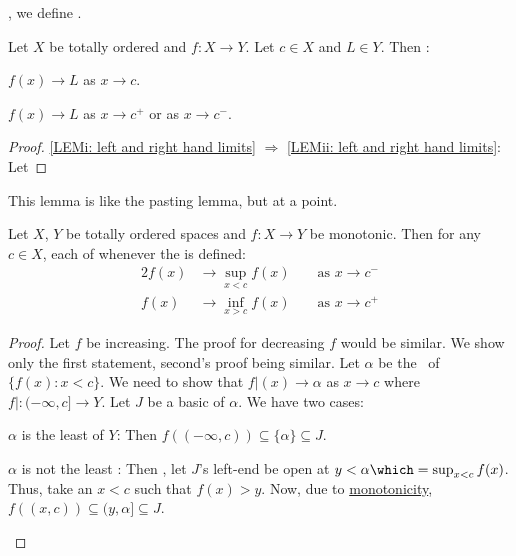 	\Lly, we define .
	
	
	\begin{lem}\label{LEM: limits via the left and right hand limits}
		Let $X$ be totally ordered and $f\colon X\to Y$. Let $c\in X$ and $L\in Y$. Then \tfae:
		\begin{mylist}
			\item\label{LEMi: left and right hand limits} $f(x)\to L$ as $x\to c$.
			
			\item\label{LEMii: left and right hand limits} $f(x)\to L$ as $x\to c^+$ or as $x\to c^-$.
		\end{mylist}
	\end{lem}
	
	\begin{proof}
		\ref{LEMi: left and right hand limits} $\Rightarrow$ \ref{LEMii: left and right hand limits}:
		Let 
	\end{proof}
	
	\begin{rmk}
		This lemma is like the pasting lemma, but at a point.
	\end{rmk}
	
	
	\begin{prp}\label{PRP: one-sided lims of monotonics}
		Let $X$, $Y$ be totally ordered spaces and $f\colon X\to Y$ be monotonic. Then for any $c\in X$, each of  whenever the \RHS is defined:
		\begin{alignat*}{2}
			f(x)& \to \sup_{x < c}f(x) &&\text{ as } x\to c^-\\
			f(x)& \to \inf_{x > c}f(x) &&\text{ as } x\to c^+
		\end{alignat*}
	\end{prp}
	
	\begin{proof}
		Let $f$ be increasing. The proof for decreasing $f$ would be similar. We show only the first statement, second's proof being similar. Let $\alpha$ be the \lub\ of $\{f(x) : x < c\}$. We need to show that $f|(x)\to \alpha$ as $x\to c$ where $f|\colon (-\infty, c]\to Y$. Let $J$ be a basic \onbd of $\alpha$. We have two cases:
		\begin{mylist}
			\item $\alpha$ is the least \elt of $Y$: Then $f((-\infty, c)) \subseteq \{\alpha\}\subseteq J$.
			
			\item $\alpha$ is not the least \elt: Then \wlogg, let $J$'s left-end be open at $y < \alpha\which = \sup_{x <c} f(x)$. Thus, take an $x < c$ such that $f(x) > y$. Now, due to \uline{monotonicity}, $f((x, c))\subseteq (y, \alpha]\subseteq J$.\qedhere
		\end{mylist}
	\end{proof}
	
